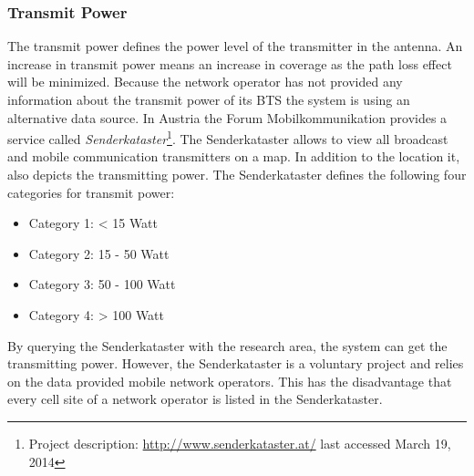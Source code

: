 \documentclass[master,english]{hgbthesis}
\begin{document}
\subsubsection{Transmit Power}
The transmit power defines the power level of the transmitter in the antenna. An increase in transmit power means an increase in coverage as the path loss effect will be minimized. Because the network operator has not provided any information about the transmit power of its BTS the system is using an alternative data source. In Austria the Forum Mobilkommunikation provides a service called \emph{Senderkataster}\footnote{Project description: \url{http://www.senderkataster.at/} last accessed March 19, 2014}. The Senderkataster allows to view all broadcast and mobile communication transmitters on a map. In addition to the location it, also depicts the transmitting power. The Senderkataster defines the following four categories for transmit power:
\begin{itemize}
	\item Category 1: < 15 Watt
	\item Category 2: 15 - 50 Watt
	\item Category 3: 50 - 100 Watt
	\item Category 4: > 100 Watt 
\end{itemize}
By querying the Senderkataster with the research area, the system can get the transmitting power. However, the Senderkataster is a voluntary project and relies on the data provided mobile network operators. This has the disadvantage that every cell site of a network operator is listed in the Senderkataster.
\end{document}
